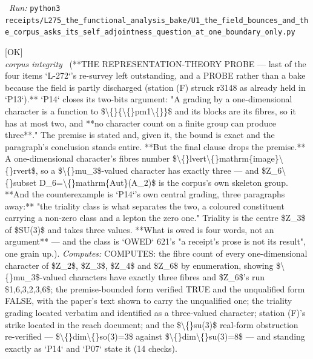 \begin{description}
\ \emph{Run:} \texttt{python3 receipts/L275\_the\_functional\_analysis\_bake/U1\_the\_field\_bounces\_and\_the\_corpus\_asks\_its\_self\_adjointness\_question\_at\_one\_boundary\_only.py}
\item[\label{rcpt:R1_a_clause_that_outruns_its_own_premise_and_the_counterexample_is_the_papers_own_grading}\texttt{R1\_a\_clause\_that\_outruns\_its\_own\_premise\_and\_the\_counterexample\_is\_the\_papers\_own\_grading}]\hfill\textsf{[OK]}\\
\textit{corpus integrity} \ (**THE REPRESENTATION-THEORY PROBE --- last of the four items `L-272`'s re-survey left outstanding, and a PROBE rather than a bake because the field is partly discharged (station (F) struck r3148 as already held in `P13`).** `P14` closes its two-bits argument: "A grading by a one-dimensional character is a function to \$\textbackslash\{\}\{\textbackslash\{\}pm1\textbackslash\{\}\}\$ and its blocks are its fibres, so it has at most two, and **no character count on a finite group can produce three**." The premise is stated and, given it, the bound is exact and the paragraph's conclusion stands entire. **But the final clause drops the premise.** A one-dimensional character's fibres number \$\textbackslash\{\}lvert\textbackslash\{\}mathrm\{image\}\textbackslash\{\}rvert\$, so a \$\textbackslash\{\}mu\_3\$-valued character has exactly three --- and \$Z\_6\textbackslash\{\}subset D\_6=\textbackslash\{\}mathrm\{Aut\}(A\_2)\$ is the corpus's own skeleton group. **And the counterexample is `P14`'s own central grading, three paragraphs away:** "the triality class is what separates the two, a coloured constituent carrying a non-zero class and a lepton the zero one." Triality is the centre \$Z\_3\$ of \$SU(3)\$ and takes three values. **What is owed is four words, not an argument** --- and the class is `OWED` 621's "a receipt's prose is not its result", one grain up.). 
\emph{Computes:} COMPUTES: the fibre count of every one-dimensional character of \$Z\_2\$, \$Z\_3\$, \$Z\_4\$ and \$Z\_6\$ by enumeration, showing \$\textbackslash\{\}mu\_3\$-valued characters have exactly three fibres and \$Z\_6\$'s run \$1,6,3,2,3,6\$; the premise-bounded form verified TRUE and the unqualified form FALSE, with the paper's text shown to carry the unqualified one; the triality grading located verbatim and identified as a three-valued character; station (F)'s strike located in the reach document; and the \$\textbackslash\{\}su(3)\$ real-form obstruction re-verified --- \$\textbackslash\{\}dim\textbackslash\{\}so(3)=3\$ against \$\textbackslash\{\}dim\textbackslash\{\}su(3)=8\$ --- and standing exactly as `P14` and `P07` state it (14 checks).

\end{description}
